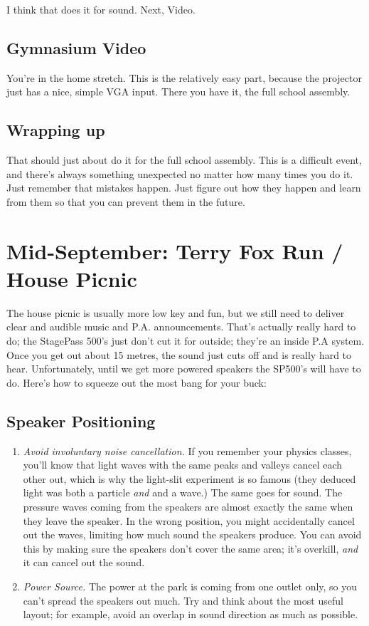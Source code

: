 \documentclass[letterpaper,10pt,oneside,headsepline]{scrreprt}
\begin{document}
I think that does it for sound. Next, Video.

\subsection{Gymnasium Video}
You're in the home stretch. This is the relatively easy part, because the projector just has a nice, simple VGA input. There you have it, the full school assembly.

\subsection{Wrapping up}
That should just about do it for the full school assembly. This is a difficult event, and there's always something unexpected no matter how many times you do it. Just remember that mistakes happen. Just figure out how they happen and learn from them so that you can prevent them in the future.

\section{Mid-September: Terry Fox Run / House Picnic}
The house picnic is usually more low key and fun, but we still need to deliver clear and audible music and P.A. announcements. That's actually really hard to do; the StagePass 500's just don't cut it for outside; they're an inside P.A system. Once you get out about 15 metres, the sound just cuts off and is really hard to hear. Unfortunately, until we get more powered speakers the SP500's will have to do. Here's how to squeeze out the most bang for your buck:
\subsection{Speaker Positioning}
\begin{enumerate}
\item \textit{Avoid involuntary noise cancellation.} If you remember your physics classes, you'll know that light waves with the same peaks and valleys cancel each other out, which is why the light-slit experiment is so famous (they deduced light was both a particle \textit{and} and a wave.) The same goes for sound. The pressure waves coming from the speakers are almost exactly the same when they leave the speaker. In the wrong position, you might accidentally cancel out the waves, limiting how much sound the speakers produce. You can avoid this by making sure the speakers don't cover the same area; it's overkill, \textit{and} it can cancel out the sound.

\item  \textit{Power Source.} The power at the park is coming from one outlet only, so you can't spread the speakers out much. Try and think about the most useful layout; for example, avoid an overlap in sound direction as much as possible.
\end{enumerate}
\end{document}
